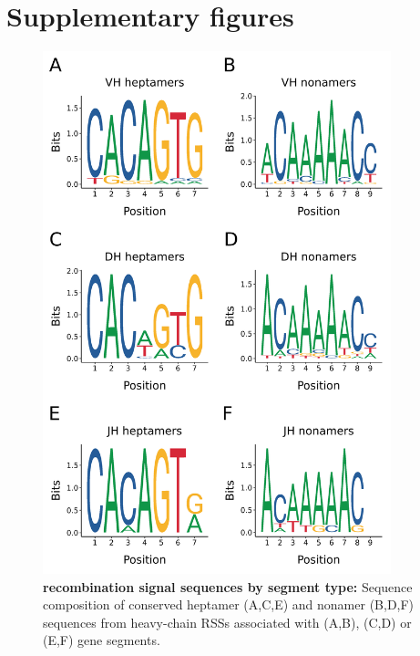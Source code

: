 \chapter{Supplementary figures}
\label{app:figures}


\begin{figure}
	\centering
	\includegraphics[width=0.9\textwidth]{_Figures/png/nfu-rss-seqlogo-sep}
	\caption[\Nfu recombination signal sequences by segment type]{\textbf{\Nfu recombination signal sequences by segment type:} Sequence composition of conserved heptamer (A,C,E) and nonamer (B,D,F) sequences from \Nfu heavy-chain RSSs associated with \vh (A,B), \dh (C,D) or \jh (E,F) gene segments.}
	\label{fig:nfu-rss-seqlogo-sep}
\end{figure}

